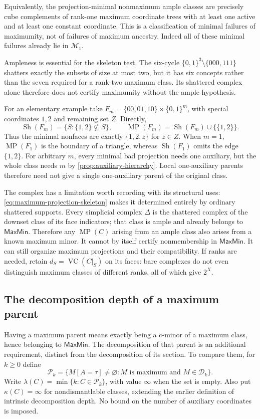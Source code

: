\documentclass[11pt]{article}
\theoremstyle{definition}
\newcommand{\bits}{\{0,1\}}
\newcommand{\MaxMin}{\mathsf{MaxMin}}
\newcommand{\Sh}{\operatorname{Sh}}
\newcommand{\VC}{\operatorname{VC}}
\begin{document}
Equivalently, the projection-minimal nonmaximum ample classes are precisely
cube complements of rank-one maximum coordinate trees with at least one
active and at least one constant coordinate. This is a classification of
minimal failures of maximumity, not of failures of maximum ancestry.
Indeed all of these minimal failures already lie in $\mathcal M_1$.

Ampleness is essential for the skeleton test. The six-cycle
$\bits^3\setminus\{000,111\}$ shatters exactly the subsets of size at
most two, but it has six concepts rather than the seven required for a
rank-two maximum class. Its shattered complex alone therefore does not
certify maximumity without the ample hypothesis.

For an elementary example take $F_m=\{00,01,10\}\times\bits^m$, with
special coordinates $1,2$ and remaining set $Z$. Directly,
\[
 \Sh(F_m)=\{S:\{1,2\}\nsubseteq S\},\qquad
 \operatorname{MP}(F_m)=\Sh(F_m)\cup\{\{1,2\}\}.
\]
Thus the minimal nonfaces are exactly $\{1,2,z\}$ for $z\in Z$.
When $m=1$, $\operatorname{MP}(F_1)$ is the boundary of a triangle, whereas
$\Sh(F_1)$ omits the edge $\{1,2\}$. For arbitrary $m$, every minimal
bad projection needs one auxiliary, but the whole class needs $m$ by
\cref{prop:auxiliary-hierarchy}. Local one-auxiliary parents therefore
need not give a single one-auxiliary parent of the original class.

The complex has a limitation worth recording with its structural uses:
\eqref{eq:maximum-projection-skeleton} makes it determined entirely by
ordinary shattered supports. Every simplicial complex $\Delta$ is the
shattered complex of the downset class of its face indicators; that class
is ample and already belongs to $\MaxMin$. Therefore any
$\operatorname{MP}(C)$ arising from an ample class also arises from a
known maximum minor. It cannot by itself certify nonmembership in $\MaxMin$.
It can still organize maximum projections and their compatibility. If ranks
are needed, retain $d_S=\VC(C|_S)$ on its faces: bare complexes do not even
distinguish maximum classes of different ranks, all of which give $2^X$.

\subsection{The decomposition depth of a maximum parent}
\label{sec:parent-depth}

Having a maximum parent means exactly being a c-minor of a maximum
class, hence belonging to $\MaxMin$. The decomposition of that parent
is an additional requirement, distinct from the decomposition of its section. To compare them, for $k\ge0$ define
\[
 \mathcal P_k=\{M[A=\tau]\ne\varnothing:
                 M\text{ is maximum and }M\in\mathcal D_k\}.
\]
Write $\lambda(C)=\min\{k:C\in\mathcal P_k\}$, with value $\infty$
when the set is empty. Also put $\kappa(C)=\infty$ for nondismantlable
classes, extending the earlier definition of intrinsic decomposition depth.
No bound on the number of auxiliary coordinates is imposed.
\end{document}
